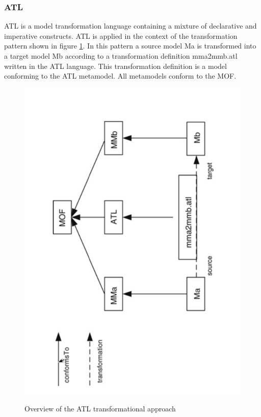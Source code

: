 \documentclass{llncs}
\begin{document}
\subsubsection{ATL}

ATL is a model transformation language containing a mixture of declarative and
imperative constructs. ATL is applied in the context of the
transformation pattern shown in figure \ref{fig:overview_atl}. In this pattern a source
model Ma is transformed into a target model Mb according to a transformation definition mma2mmb.atl written in the ATL language. This transformation definition is a model conforming to the ATL metamodel. All metamodels conform to the MOF.

\begin{figure}
	\centering
	\includegraphics[angle=270, width=1\textwidth,natwidth=610,natheight=642]{figures/Overview_ATL.pdf}
	\caption{Overview of the ATL transformational approach}\cite{atl:frederic}
	\label{fig:overview_atl}
\end{figure}
\end{document}
